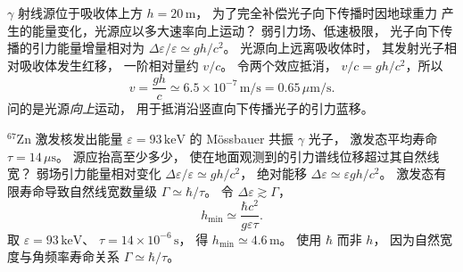 $\gamma$ 射线源位于吸收体上方
$h=20\,\mathrm m$，
为了完全补偿光子向下传播时因地球重力
产生的能量变化，光源应以多大速率向上运动？
\exsolution
弱引力场、低速极限，
光子向下传播的引力能量增量相对为
$\Delta\varepsilon/\varepsilon\simeq gh/c^2$。
光源向上远离吸收体时，
其发射光子相对吸收体发生红移，
一阶相对量约 $v/c$。
令两个效应抵消，
$v/c=gh/c^2$，所以
\[
 \boxed{v=\frac{gh}{c}\simeq
 6.5\times10^{-7}\,\mathrm{m/s}
 =0.65\,\mu\mathrm{m/s}}.
\]
\excheck 问的是光源\emph{向上}运动，
用于抵消沿竖直向下传播光子的引力蓝移。

$\mathrm{^{67}Zn}$ 激发核发出能量
$\varepsilon=93\,\mathrm{keV}$ 的
Mössbauer 共振 $\gamma$ 光子，
激发态平均寿命 $\tau=14\,\mu\mathrm s$。
源应抬高至少多少，
使在地面观测到的引力谱线位移超过其自然线宽？
\exsolution
弱场引力能量相对变化
$\Delta\varepsilon/\varepsilon\simeq gh/c^2$，
绝对能移
$\Delta\varepsilon\simeq\varepsilon gh/c^2$。
激发态有限寿命导致自然线宽数量级
$\Gamma\simeq\hbar/\tau$。
令 $\Delta\varepsilon\gtrsim\Gamma$，
\[
 \boxed{h_{\min}\simeq
 \frac{\hbar c^2}{g\varepsilon\tau}}.
\]
取 $\varepsilon=93\,\mathrm{keV}$、
$\tau=14\times10^{-6}\,\mathrm s$，
得
$\boxed{h_{\min}\simeq4.6\,\mathrm m}$。
\excheck 使用 $\hbar$ 而非 $h$，
因为自然宽度与角频率寿命关系
$\Gamma\simeq\hbar/\tau$。
